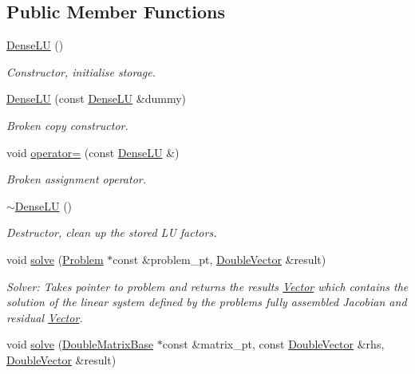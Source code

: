 \subsection*{Public Member Functions}
\begin{DoxyCompactItemize}
\item 
\hyperlink{classoomph_1_1DenseLU_a7d8217ef310a5c5ad224e4e6aa40d923}{Dense\+LU} ()
\begin{DoxyCompactList}\small\item\em Constructor, initialise storage. \end{DoxyCompactList}\item 
\hyperlink{classoomph_1_1DenseLU_a5f0c2eb1cbe142498d12ae14e3cadca2}{Dense\+LU} (const \hyperlink{classoomph_1_1DenseLU}{Dense\+LU} \&dummy)
\begin{DoxyCompactList}\small\item\em Broken copy constructor. \end{DoxyCompactList}\item 
void \hyperlink{classoomph_1_1DenseLU_a90c01b2a2471b4e038c6d5138c86c378}{operator=} (const \hyperlink{classoomph_1_1DenseLU}{Dense\+LU} \&)
\begin{DoxyCompactList}\small\item\em Broken assignment operator. \end{DoxyCompactList}\item 
\hyperlink{classoomph_1_1DenseLU_a012d934c8dec17f2ca3ad504939ab29d}{$\sim$\+Dense\+LU} ()
\begin{DoxyCompactList}\small\item\em Destructor, clean up the stored LU factors. \end{DoxyCompactList}\item 
void \hyperlink{classoomph_1_1DenseLU_ac354b224819146618ce8a1396f8f980e}{solve} (\hyperlink{classoomph_1_1Problem}{Problem} $\ast$const \&problem\+\_\+pt, \hyperlink{classoomph_1_1DoubleVector}{Double\+Vector} \&result)
\begin{DoxyCompactList}\small\item\em Solver\+: Takes pointer to problem and returns the results \hyperlink{classoomph_1_1Vector}{Vector} which contains the solution of the linear system defined by the problem\textquotesingle{}s fully assembled Jacobian and residual \hyperlink{classoomph_1_1Vector}{Vector}. \end{DoxyCompactList}\item 
void \hyperlink{classoomph_1_1DenseLU_ae82e044bb5a1173b8105b6fedd904801}{solve} (\hyperlink{classoomph_1_1DoubleMatrixBase}{Double\+Matrix\+Base} $\ast$const \&matrix\+\_\+pt, const \hyperlink{classoomph_1_1DoubleVector}{Double\+Vector} \&rhs, \hyperlink{classoomph_1_1DoubleVector}{Double\+Vector} \&result)

\end{DoxyCompactItemize}
